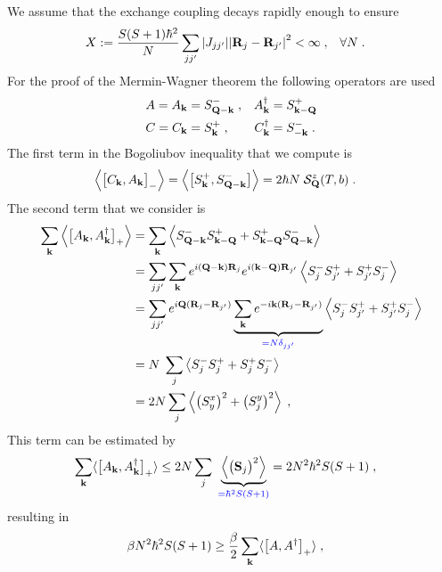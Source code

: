 We assume that the exchange coupling decays rapidly enough to ensure
%
\begin{align}\label{eq:X}
X&:=\frac{S(S+1)\hbar^{2}}{N} \sum_{jj'} \abs{J_{jj'}} \abs{\mathbf R_{j}-\mathbf R_{j'}}^{2} < \infty\;,&&\forall N\;.
\end{align}
%
For the proof of the Mermin-Wagner theorem the following operators are used
%
\begin{subequations}\label{eq:MW:operators}
\begin{align}\label{eq:}
A = A_{\mathbf k}&=S^{-}_{\mathbf Q-\mathbf k}\;,&A^{\dagger}_{\mathbf k} &=S^{+}_{\mathbf k-\mathbf Q}\\
C = C_{\mathbf k} &=S^{+}_{\mathbf k}\;,&C^{\dagger}_{\mathbf k} &=S^{-}_{-\mathbf k}\;.
\end{align}
\end{subequations}
%
The first term in  the Bogoliubov inequality that we compute is
%
\begin{align}\label{eq:MW:1}
\left\langle\big[ C_{\mathbf k},A_{\mathbf k} \big]_{-}\right\rangle  &= \left\langle\big[ S^{+}_{\mathbf k},S^{-}_{\mathbf Q-\mathbf k} \big]\right\rangle
= 2 \hbar N\;{\cal S}^{z}_{\mathbf Q}(T,b) \;.
\end{align}
%
The second term  that we consider is
%
\begin{align}\label{eq:}
\sum_{\mathbf k} \left\langle\big[ A_{\mathbf k},A_{\mathbf k}^{\dagger} \big]_{+} \right\rangle 
&=\sum_{\mathbf k}\left\langle  S^{-}_{\mathbf Q-\mathbf k} S^{+}_{\mathbf k - \mathbf Q}
+S^{+}_{\mathbf k - \mathbf Q} S^{-}_{\mathbf Q-\mathbf k}\right\rangle\\
&=\sum_{jj'}\sum_{\mathbf k} e^{i(\mathbf Q - \mathbf k)\mathbf R_{j}}e^{i(\mathbf k - \mathbf Q )\mathbf R_{j'}}\left\langle  S^{-}_{j} S^{+}_{j'}
+S^{+}_{j'} S^{-}_{j}\right\rangle\\
&=\sum_{jj'} e^{i \mathbf Q (\mathbf R_{j}- \mathbf R_{j'})}
\underbrace{
\sum_{\mathbf k} e^{-i \mathbf k(\mathbf R_{j}-\mathbf R_{j'})} 
}_{\color{blue} = N \delta_{jj'}}
\left\langle  S^{-}_{j} S^{+}_{j'}
+S^{+}_{j'} S^{-}_{j}\right\rangle\\
&=N \;\sum_{j} 
\left\langle  S^{-}_{j} S^{+}_{j}
+S^{+}_{j} S^{-}_{j}\right\rangle\\
&=2N\sum_{j} \left\langle \big(S^{x}_{y}\big)^{2}+\big(S^{y}_{j}\big)^{2}\right\rangle\;,
\end{align}
%
This term can be estimated by
%
\begin{align*}
\sum_{\mathbf k} \langle\big[ A_{\mathbf k},A_{\mathbf k}^{\dagger} \big]_{+}  \rangle 
&\le 2N\sum_{j}\; \underbrace{
\left\langle \big(\mathbf S_{j}\big)^{2}\right\rangle
}_{\color{blue} = \hbar^{2}S(S+1)}
=2N^{2}\hbar^{2}S(S+1)\;,
\end{align*}
%
resulting in
%
\begin{align}\label{eq:MW:2}
 \beta N^{2} \hbar^{2} S(S+1)&\ge
  \frac{\beta}{2}\sum_{\mathbf k} \langle\big[ A,A^{\dagger} \big]_{+}  \rangle  \;,
\end{align}
